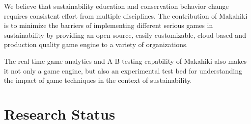 \documentclass{acm_proc_article-sp}
\begin{document}
We believe that sustainability education and conservation behavior change requires consistent effort from multiple disciplines. The contribution of Makahiki is to minimize the barriers of implementing different serious games in sustainability by providing an open source, easily customizable, cloud-based and production quality game engine to a variety of organizations.

The real-time game analytics and A-B testing capability of Makahiki also makes it not only a game engine, but also an experimental test bed for understanding the impact of game techniques in the context of sustainability.

\section{Research Status}


%
\end{document}
